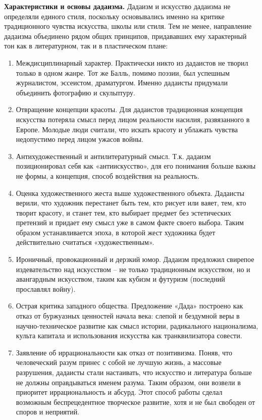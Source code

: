 \textbf{Характеристики и основы дадаизма.}
Дадаизм и искусство дадаизма не определяли единого стиля, поскольку основывались именно на критике традиционного чувства искусства, школы или стиля. Тем не менее, направление дадаизма объединено рядом общих принципов, придававших ему характерный тон как в литературном, так и в пластическом плане:
\begin{enumerate}
    \item Междисциплинарный характер. Практически никто из дадаистов не творил только в одном жанре. Тот же Балль, помимо поэзии, был успешным журналистом, эссеистом, драматургом. Именно дадаисты придумали объединить фотографию и скульптуру.
    \item Отвращение концепции красоты. Для дадаистов традиционная концепция искусства потеряла смысл перед лицом реальности насилия, развязанного в Европе. Молодые люди считали, что искать красоту и ублажать чувства недопустимо перед лицом ужасов войны.
    \item Антихудожественный и антилитературный смысл. Т.к. дадаизм позиционировал себя как «антиискусство», для его понимания больше важны не формы, а концепция, способ воздействия на реальность.
    \item Оценка художественного жеста выше художественного объекта. Дадаисты верили, что художник перестанет быть тем, кто рисует или ваяет, тем, кто творит красоту, и станет тем, кто выбирает предмет без эстетических претензий и придает ему смысл уже в самом факте своего выбора. Таким образом устанавливается эпоха, в которой жест художника будет действительно считаться «художественным».
    \item Ироничный, провокационный и дерзкий юмор. Дадаизм предложил свирепое издевательство над искусством – не только традиционным искусством, но и авангардным искусством, таким как кубизм и футуризм (последний прославлял войну).
    \item Острая критика западного общества. Предложение «Дада» построено как отказ от буржуазных ценностей начала века: слепой и бездумной веры в научно-техническое развитие как смысл истории, радикального национализма, культа капитала и использования искусства как транквилизатора совести.
    \item Заявление об иррациональности как отказ от позитивизма. Поняв, что человеческий разум принес с собой не лучшую жизнь, а массовые разрушения, дадаисты стали настаивать, что искусство и литература больше не должны оправдываться именем разума. Таким образом, они возвели в приоритет иррациональность и абсурд. Этот способ работы сделал возможным беспрецедентное творческое развитие, хотя и не был свободен от споров и неприятий.

\end{enumerate}
